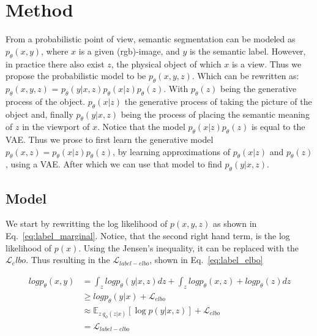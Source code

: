 \chapter{Method}\label{chapter:first_real_chapter}
From a probabilistic point of view, semantic segmentation can be modeled as $p_\theta(x,y)$, where $x$ is a given (rgb)-image, and $y$ is the semantic label. However, in practice there also exist $z$, the physical object of which $x$ is a view. Thus we propose the probabilistic model to be $p_\theta(x,y,z)$. Which can be rewritten as: $p_\theta(x,y,z)$ = $p_\theta(y|x,z) p_\theta(x|z) p_\theta(z)$. With $p_\theta(z)$ being the generative process of the object. $p_\theta(x|z)$ the generative process of taking the picture of the object and, finally $p_\theta(y|x,z)$ being the process of placing the semantic meaning of $z$ in the viewport of $x$. Notice that the model $p_\theta(x|z) p_\theta(z)$ is equal to the VAE. Thus we prose to first learn the generative model $p_\theta(x,z) = p_\theta(x|z) p_\theta(z)$, by learning approximations of $p_\theta(x|z)$ and $p_\theta(z)$, using a VAE. After which we can use that model to find $p_\theta(y|x,z)$.

\section{Model}
We start by rewritting the log likelihood of $p(x, y, z)$ as shown in Eq.~\ref{eq:label_marginal}. Notice, that the second right hand term, is the log likelihood of $p(x)$. Using the Jensen's inequality, it can be replaced with the $\mathcal{L}_elbo$. Thus resulting in the $\mathcal{L}_{label-elbo}$, shown in Eq.~\ref{eq:label_elbo}

\begin{subequations}
    \begin{align}
        log p_\theta(x, y) & = \int_z log p_\theta(y | x, z) dz +  \int_z log p_\theta(x, z) + log p_\theta(z) dz             \label{eq:label_marginal} \\
                           & \geq log p_\theta(y | x) + \mathcal{L}_{elbo}                                                                              \\
                           & \approx \mathbb{E}_{z~q_{\phi}(z | x)}[\log p(y|x, z)] + \mathcal{L}_{elbo}                                                \\
                           & = \mathcal{L}_{label-elbo} \label{eq:label_elbo}
    \end{align}
\end{subequations}

